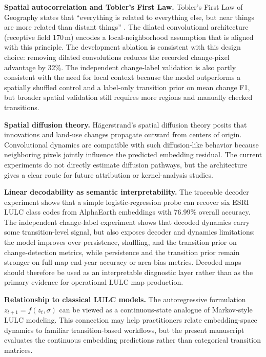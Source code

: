 \documentclass{article}
\begin{document}
\textbf{Spatial autocorrelation and Tobler's First Law.}
Tobler's First Law of Geography states that ``everything is related to everything else, but near things are more related than distant things'' \citep{tobler1970computer}. The dilated convolutional architecture (receptive field 170\,m) encodes a local-neighborhood assumption that is aligned with this principle. The development ablation is consistent with this design choice: removing dilated convolutions reduces the recorded change-pixel advantage by 32\%. The independent change-label validation is also partly consistent with the need for local context because the model outperforms a spatially shuffled control and a label-only transition prior on mean change F1, but broader spatial validation still requires more regions and manually checked transitions.

\textbf{Spatial diffusion theory.}
H\"{a}gerstrand's spatial diffusion theory posits that innovations and land-use changes propagate outward from centers of origin. Convolutional dynamics are compatible with such diffusion-like behavior because neighboring pixels jointly influence the predicted embedding residual. The current experiments do not directly estimate diffusion pathways, but the architecture gives a clear route for future attribution or kernel-analysis studies.

\textbf{Linear decodability as semantic interpretability.}
The traceable decoder experiment shows that a simple logistic-regression probe can recover six ESRI LULC class codes from AlphaEarth embeddings with 76.99\% overall accuracy. The independent change-label experiment shows that decoded dynamics carry some transition-level signal, but also exposes decoder and dynamics limitations: the model improves over persistence, shuffling, and the transition prior on change-detection metrics, while persistence and the transition prior remain stronger on full-map end-year accuracy or area-bias metrics. Decoded maps should therefore be used as an interpretable diagnostic layer rather than as the primary evidence for operational LULC map production.

\textbf{Relationship to classical LULC models.}
The autoregressive formulation $z_{t+1} = f(z_t, \sigma)$ can be viewed as a continuous-state analogue of Markov-style LULC modeling. This connection may help practitioners relate embedding-space dynamics to familiar transition-based workflows, but the present manuscript evaluates the continuous embedding predictions rather than categorical transition matrices.
\end{document}
